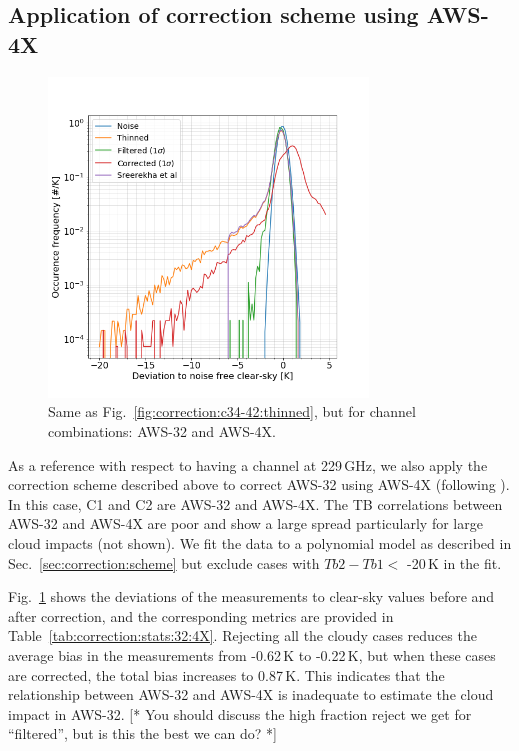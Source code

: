 \documentclass[12pt]{article}
\begin{document}
\subsection{Application of correction scheme using AWS-4X}
%
\begin{figure}[!t]
	\centering
	\includegraphics[height=85mm]{PDF_corrected_AWS-32_AWS-4X_thinned}
	\caption{Same as Fig.~\ref{fig:correction:c34-42:thinned}, but for channel combinations: AWS-32 and AWS-4X.}
	\label{fig:correction:c32-4X:thinned}
\end{figure}
%

As a reference with respect to having a channel at 229\,GHz, we also apply the
correction scheme described above to correct AWS-32 using AWS-4X (following
\citet{rekha2012potential}). In this case, C1 and C2 are AWS-32 and AWS-4X. The
TB correlations between AWS-32 and AWS-4X are poor and show a large spread
particularly for large cloud impacts (not shown). We fit the data to a polynomial model as described in Sec.~\ref{sec:correction:scheme} but exclude cases with $Tb2-Tb1 <$ -20\,K in the fit.

Fig.~\ref{fig:correction:c32-4X:thinned} shows the deviations of the
measurements to clear-sky values before and after correction, and the
corresponding metrics are provided in Table~\ref{tab:correction:stats:32:4X}.
Rejecting all the cloudy cases reduces the average bias in the measurements
from -0.62\,K to -0.22\,K, but when these cases are corrected, the total bias
increases to 0.87\,K. This indicates that the relationship between AWS-32 and
AWS-4X is inadequate to estimate the cloud impact in AWS-32.
[* You should discuss the high fraction reject we get for ``filtered'', but is
this the best we can do? *]
\end{document}
